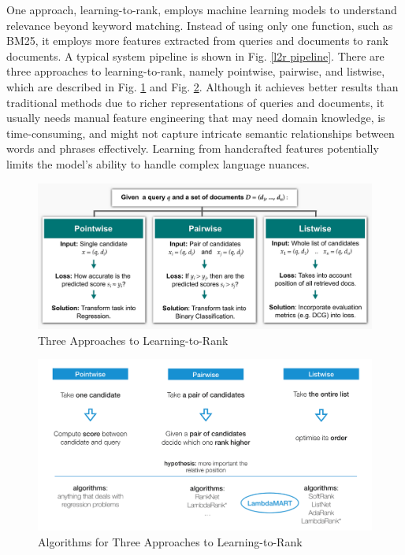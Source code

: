 \documentclass[11pt]{article}
\begin{document}
One approach, learning-to-rank, employs machine learning models to
understand relevance beyond keyword matching. Instead of using only one
function, such as BM25, it employs more features extracted from queries
and documents to rank documents. A typical system pipeline is shown in
Fig. \ref{l2r pipeline}. There are three approaches to learning-to-rank, namely
pointwise, pairwise, and listwise, which are described in Fig. \ref{l2r approaches} and
Fig. \ref{l2r algorithms}. Although it achieves better results than traditional methods due
to richer representations of queries and documents, it usually needs
manual feature engineering that may need domain knowledge, is
time-consuming, and might not capture intricate semantic relationships
between words and phrases effectively. Learning from handcrafted
features potentially limits the model's ability to handle complex
language nuances.

\begin{figure}[!h]
\includegraphics{readme.assets/1s3CQuNRWcQNkQKd8Met-MA.png}
\caption{Three Approaches to Learning-to-Rank \cite{c4}}
\label{l2r approaches}
\end{figure}

\begin{figure}[!h]
\includegraphics{readme.assets/list_wise_lucidworks.png}
\caption{Algorithms for Three Approaches to Learning-to-Rank \cite{c5}}
\label{l2r algorithms}
\end{figure}
\end{document}
